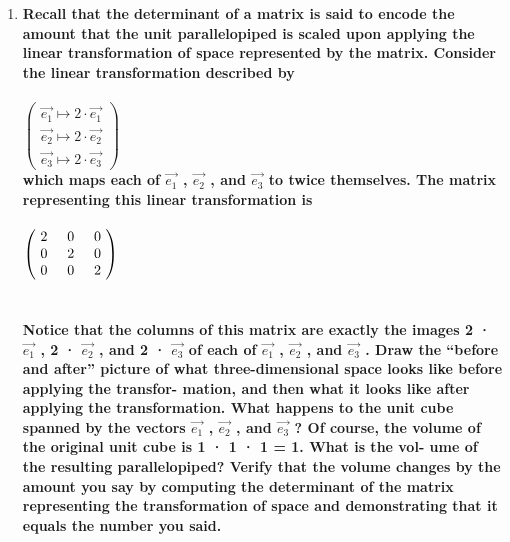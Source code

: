 \documentclass{article}
\begin{document}
\begin{enumerate}[7.]
\item\textbf{Recall that the determinant of a matrix is said to encode the amount that the
unit parallelopiped is scaled upon applying the linear transformation of space
represented by the matrix. Consider the linear transformation described by\\\\$\left(\!\begin{array}{c}\vec{e_{1}}\mapsto2\cdot\vec{e_{1}}\\ \vec{e_{2}}\mapsto2\cdot\vec{e_{2}} \\  \vec{e_{3}}\mapsto2\cdot\vec{e_{3}}\end{array} \!\right)$\\which maps each of $\vec{e_{1}}$ , $\vec{e_{2}}$  , and $\vec{e_{3}}$  to twice themselves. The matrix representing
this linear transformation is\\\\$\left(\!
    \begin{array}{c}
      2 \hspace{.5cm} 0 \hspace{.5cm} 0 \\
      0 \hspace{.5cm} 2 \hspace{.5cm} 0 \\
      0 \hspace{.5cm} 0 \hspace{.5cm} 2 \\
    \end{array}
  \!\right)$\\\\\\Notice that the columns of this matrix are exactly the images 2 · $\vec{e_{1}}$ , 2 · $\vec{e_{2}}$ , and 2 · $\vec{e_{3}}$ of each of $\vec{e_{1}}$ , $\vec{e_{2}}$ , and $\vec{e_{3}}$ . Draw the “before and after” picture of
what three-dimensional space looks like before applying the transfor-
mation, and then what it looks like after applying the transformation.
What happens to the unit cube spanned by the vectors $\vec{e_{1}}$ , $\vec{e_{2}}$ , and $\vec{e_{3}}$ ?
Of course, the volume of the original unit cube is 1 · 1 · 1 = 1. What is the vol-
ume of the resulting parallelopiped? Verify that the volume changes
by the amount you say by computing the determinant of the matrix
representing the transformation of space and demonstrating that it
equals the number you said.}
\end{enumerate}
\end{document}
